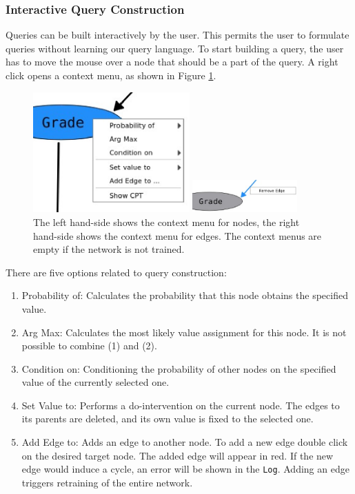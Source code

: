 \subsubsection{Interactive Query Construction}
Queries can be built interactively by the user. This permits the user to formulate queries without learning our query language.
To start building a query, the user has to move the mouse over a node that should be a part of the query.
A right click opens a context menu, as shown in Figure \ref{figure:menu}.
\begin{figure}[H]
  \begin{minipage}{6cm}
  \includegraphics[width=6cm]{pic/menu1.eps}
  \end{minipage}
  \begin{minipage}{6cm}
 \includegraphics[width=4cm]{pic/menu2.eps}
  \end{minipage}
  \caption{The left hand-side shows the context menu for nodes, the right hand-side shows the context menu for edges. The context menus are empty if the network is not trained.}
  \label{figure:menu}
\end{figure}
There are five options related to query construction:
\begin{enumerate}
 \item Probability of: Calculates the probability that this node obtains the specified value.
 \item Arg Max: Calculates the most likely value assignment for this node. It is not possible to combine (1) and (2).
 \item Condition on: Conditioning the probability of other nodes on the specified value of the currently selected one.
 \item Set Value to: Performs a do-intervention on the current node. The edges to its parents are deleted, and its own value is fixed to the selected one.
 \item Add Edge to: Adds an edge to another node. To add a new edge double click on the desired target node. The added edge will appear in red. If the new edge would induce a cycle, an error will be shown in the \texttt{Log}.
 Adding an edge triggers retraining of the entire network.
\end{enumerate}

